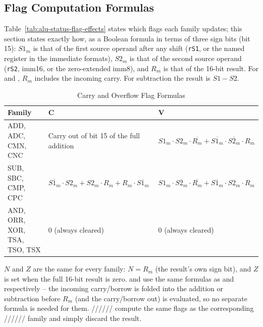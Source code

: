 \subsection{Flag Computation Formulas}

Table~\ref{tab:alu-status-flag-effects} states which flags each family updates; this section states exactly how, as a
Boolean formula in terms of three sign bits (bit 15): $S1_m$ is that of the first source operand after any shift
(\texttt{rS1}, or the named register in the immediate formats), $S2_m$ is that of the second source operand
(\texttt{rS2}, imm16, or the zero-extended imm8), and $R_m$ is that of the 16-bit result. For  and
, $R_m$ includes the incoming carry. For subtraction the result is $S1 - S2$.

\begin{table}[H]
	\centering
	\begin{tabular}{lp{5.2cm}p{5.2cm}}
		\toprule
		\textbf{Family}              & \textbf{C}                                                                & \textbf{V}                                                                               \\
		\midrule
		ADD, ADC, CMN, CNC           & Carry out of bit 15 of the full addition                                  & $S1_m \cdot S2_m \cdot \overline{R_m} + \overline{S1_m} \cdot \overline{S2_m} \cdot R_m$ \\
		SUB, SBC, CMP, CPC           & $\overline{S1_m} \cdot S2_m + S2_m \cdot R_m + R_m \cdot \overline{S1_m}$ & $S1_m \cdot \overline{S2_m} \cdot \overline{R_m} + \overline{S1_m} \cdot S2_m \cdot R_m$ \\
		AND, ORR, XOR, TSA, TSO, TSX & $0$ (always cleared)                                                      & $0$ (always cleared)                                                                     \\
		\bottomrule
	\end{tabular}
	\caption{Carry and Overflow Flag Formulas}
	\label{tab:alu-flag-formulas}
\end{table}

$N$ and $Z$ are the same for every family: $N = R_m$ (the result's own sign bit), and $Z$ is set when the full
16-bit result is zero.  and  use the same formulas as  and
 respectively -- the incoming carry/borrow is folded into the addition or subtraction before
$R_m$ (and the carry/borrow out) is evaluated, so no separate formula is needed for them.
////// compute
the same flags as the corresponding
////// family
and simply discard the result.

